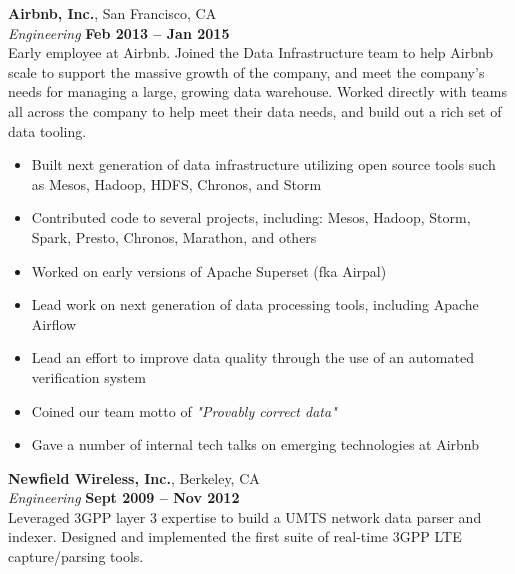 \documentclass[margin,line]{resume}
\begin{document}
\begin{resume}
    \textbf{Airbnb, Inc.}, San Francisco, CA \vspace{2mm}\\\vspace{1mm}%
    \textsl{Engineering} \hfill \textbf{Feb 2013 -- Jan 2015}\\
    Early employee at Airbnb. Joined the Data Infrastructure team to help
    Airbnb scale to support the massive growth of the company, and meet the
    company's needs for managing a large, growing data warehouse. Worked
    directly with teams all across the company to help meet their data needs,
    and build out a rich set of data tooling.

    \begin{itemize}
        \item Built next generation of data infrastructure utilizing open source
        tools such as Mesos, Hadoop, HDFS, Chronos, and Storm
        \item Contributed code to several projects, including: Mesos, Hadoop,
        Storm, Spark, Presto, Chronos, Marathon, and others
        \item Worked on early versions of Apache Superset (fka Airpal)
        \item Lead work on next generation of data processing tools, including
        Apache Airflow
        \item Lead an effort to improve data quality through the use of an
        automated verification system
        \item Coined our team motto of \emph{"Provably correct data"}
        \item Gave a number of internal tech talks on emerging technologies at
        Airbnb
    \end{itemize}

    \textbf{Newfield Wireless, Inc.}, Berkeley, CA \vspace{2mm}\\\vspace{1mm}%
    \textsl{Engineering} \hfill \textbf{Sept 2009 -- Nov 2012}\\
    Leveraged 3GPP layer 3 expertise to build a UMTS network data parser and
    indexer. Designed and implemented the first suite of real-time 3GPP LTE
    capture/parsing tools.


\end{resume}
\end{document}
